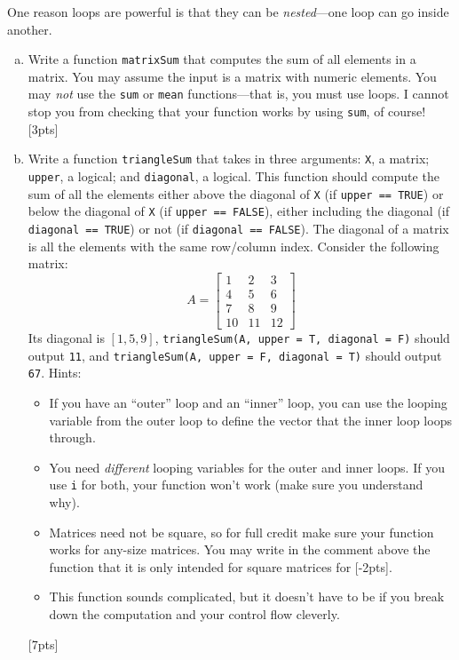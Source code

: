 \documentclass[12pt]{article}
\begin{document}
One reason loops are powerful is that they can be \textit{nested}---one loop can go inside another.

\begin{enumerate}[(a)]
	\item Write a function \verb|matrixSum| that computes the sum of all elements in a matrix. You may assume the input is a matrix with numeric elements. You may \textit{not} use the \verb|sum| or \verb|mean| functions---that is, you must use loops. I cannot stop you from checking that your function works by using \verb|sum|, of course! [3pts]
	\item Write a function \verb|triangleSum| that takes in three arguments: \verb|X|, a matrix; \verb|upper|, a logical; and \verb|diagonal|, a logical. This function should compute the sum of all the elements either above the diagonal of \verb|X| (if \verb|upper == TRUE|) or below the diagonal of \verb|X| (if \verb|upper == FALSE|), either including the diagonal (if \verb|diagonal == TRUE|) or not (if \verb|diagonal == FALSE|). The diagonal of a matrix is all the elements with the same row/column index. Consider the following matrix:
	\[A =
	\begin{bmatrix}
	1 & 2 & 3 \\
	4 & 5 & 6 \\
	7 & 8 & 9 \\
	10 & 11 & 12
	\end{bmatrix}\]
	Its diagonal is $[1,5,9]$, \verb|triangleSum(A, upper = T, diagonal = F)| should output \verb|11|, and \verb|triangleSum(A, upper = F, diagonal = T)| should output \verb|67|.
	Hints:
	\begin{itemize}
		\item If you have an ``outer'' loop and an ``inner'' loop, you can use the looping variable from the outer loop to define the vector that the inner loop loops through.
		\item You need \textit{different} looping variables for the outer and inner loops. If you use \verb|i| for both, your function won't work (make sure you understand why).
		\item Matrices need not be square, so for full credit make sure your function works for any-size matrices. You may write in the comment above the function that it is only intended for square matrices for [-2pts].
		\item This function sounds complicated, but it doesn't have to be if you break down the computation and your control flow cleverly.
	\end{itemize}
	[7pts]
\end{enumerate}
\end{document}
